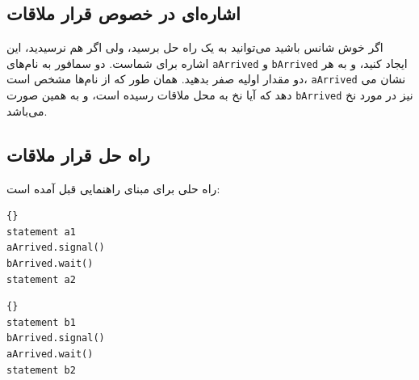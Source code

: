 \documentclass{book}
\newcommand{\clearemptydoublepage}{\newpage\cleardoublepage}
\begin{document}
\subsection{اشاره‌ای در خصوص قرار ملاقات}
	

اگر خوش شانس باشید می‌توانید به یک راه حل برسید، ولی اگر هم نرسیدید، این اشاره برای شماست. دو سمافور به 
نام‌های \texttt{aArrived} و \texttt{bArrived} ایجاد کنید، و به هر دو مقدار اولیه صفر بدهید. همان طور که از نام‌ها مشخص است، \texttt{aArrived} نشان می دهد که آیا نخ  به محل ملاقات رسیده است، و به همین صورت \texttt{bArrived} 
نیز در مورد نخ  می‌باشد.

\clearemptydoublepage
\subsection{راه حل قرار ملاقات }

    راه حلی برای مبنای راهنمایی قبل آمده است: 

\begin{latin}
\begin{minipage}[t]{2in}
\begin{latin}
\begin{lstlisting}[title=\rl{نخ \lr{A}}]{}
statement a1
aArrived.signal()
bArrived.wait()
statement a2
\end{lstlisting}
\end{latin}
\end{minipage}
\hfill
\begin{minipage}[t]{2in}
\begin{latin}
\begin{lstlisting}[title=\rl{نخ \lr{B}}]{}
statement b1
bArrived.signal()
aArrived.wait()
statement b2
\end{lstlisting}
\end{latin}
\end{minipage}
\end{latin}
\end{document}
